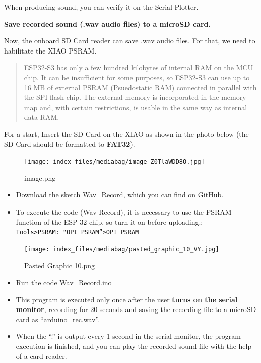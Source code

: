 \documentclass[
  letterpaper,
  DIV=11,
  numbers=noendperiod]{scrreprt}
\providecommand{\tightlist}{%
  \setlength{\itemsep}{0pt}\setlength{\parskip}{0pt}}\usepackage{longtable,booktabs,array}
\begin{document}
When producing sound, you can verify it on the Serial Plotter.

\textbf{Save recorded sound (.wav audio files) to a microSD card.}

Now, the onboard SD Card reader can save .wav audio files. For that, we
need to habilitate the XIAO PSRAM.

\begin{quote}
ESP32-S3 has only a few hundred kilobytes of internal RAM on the MCU
chip. It can be insufficient for some purposes, so ESP32-S3 can use up
to 16 MB of external PSRAM (Psuedostatic RAM) connected in parallel with
the SPI flash chip. The external memory is incorporated in the memory
map and, with certain restrictions, is usable in the same way as
internal data RAM.
\end{quote}

For a start, Insert the SD Card on the XIAO as shown in the photo below
(the SD Card should be formatted to \textbf{FAT32}).

\begin{figure}[H]

{\centering \texttt{[image: index\_files/mediabag/image\_Z0TlaWDD8O.jpg]}

}

\caption{image.png}

\end{figure}

\begin{itemize}
\tightlist
\item
  Download the sketch
  \href{https://github.com/Mjrovai/XIAO-ESP32S3-Sense/tree/main/Mic_Test/Wav_Record}{Wav\_Record},
  which you can find on GitHub.
\item
  To execute the code (Wav Record), it is necessary to use the PSRAM
  function of the ESP-32 chip, so turn it on before uploading.:
  \texttt{Tools\textgreater{}PSRAM:\ "OPI\ PSRAM”\textgreater{}OPI\ PSRAM}
\end{itemize}

\begin{figure}[H]

{\centering \texttt{[image: index\_files/mediabag/pasted\_graphic\_10\_VY.jpg]}

}

\caption{Pasted Graphic 10.png}

\end{figure}

\begin{itemize}
\tightlist
\item
  Run the code Wav\_Record.ino
\item
  This program is executed only once after the user \textbf{turns on the
  serial monitor}, recording for 20 seconds and saving the recording
  file to a microSD card as ``arduino\_rec.wav''.
\item
  When the ``.'' is output every 1 second in the serial monitor, the
  program execution is finished, and you can play the recorded sound
  file with the help of a card reader.
\end{itemize}
\end{document}
